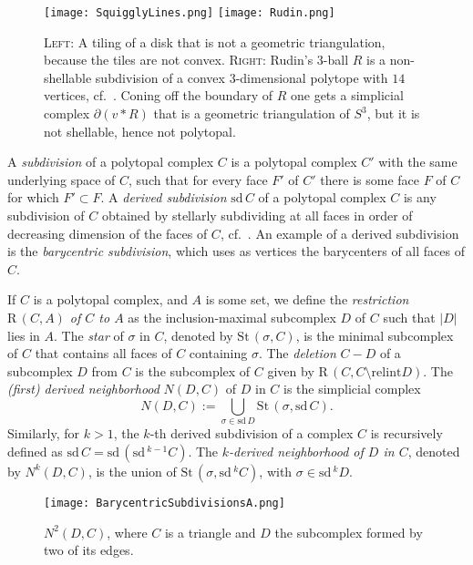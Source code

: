 \documentclass[a4paper,11pt]{article}
\theoremstyle{plain}
\theoremstyle{definition}
\newcommand{\rint}{\mathrm{relint}}
\newcommand{\RS}{\mathrm{R}\,}
\newcommand{\St}{\mathrm{St}\, }
\newcommand{\sd}{\mathrm{sd}\, }
\begin{document}
\begin{figure}[htb]
	\centering
  \texttt{[image: SquigglyLines.png]}
  \hskip10mm
    \texttt{[image: Rudin.png]}
 	\caption{\footnotesize \textsc{Left:} A tiling of a disk that is not a geometric triangulation, because the tiles are not convex. \textsc{Right:} Rudin's $3$-ball $R$ is a non-shellable subdivision of a convex $3$-dimensional polytope with $14$ vertices, cf.~\cite{Wotzlaw}. Coning off the boundary of $R$ one gets a simplicial complex $\partial (v \ast R)$ that is a geometric triangulation of $S^3$, but it is not shellable, hence not polytopal.}
	\label{fig:NonGeo}
\end{figure}


A \emph{subdivision} of a polytopal complex $C$ is a polytopal complex $C'$ with the same underlying space of $C$, such that for every face $F'$ of $C'$ there is some face $F$ of $C$ for which $F' \subset F$. A \emph{derived subdivision} $\sd  C$ of a polytopal complex $C$ is any subdivision of $C$ obtained by stellarly subdividing at all faces in order of decreasing dimension of the faces of $C$, cf.\ \cite{Hudson}.  An example of a derived subdivision is the \emph{barycentric subdivision}, which uses as vertices the barycenters of all faces of $C$.
 
If $C$ is a polytopal complex, and $A$ is some set, we define the \emph{restriction $\RS(C,A)$ of $C$ to $A$} as the inclusion-maximal subcomplex $D$ of $C$ such that $|D|$ lies in $A$. The \emph{star} of $\sigma$ in $C$, denoted by $\St(\sigma, C)$, is the minimal subcomplex of $C$ that contains all faces of $C$ containing $\sigma$. The \emph{deletion} $C-D$ of a subcomplex $D$ from $C$ is the subcomplex of $C$ given by $\RS(C,  C{\setminus} \rint{D})$. The \emph{(first) derived neighborhood} $N(D,C)$ of $D$ in $C$ is the simplicial complex
\[N(D,C):=\bigcup_{\sigma\in \sd D} \St(\sigma,\sd C). \] 
Similarly, for $k > 1$,  the $k$-th derived subdivision of a complex $C$ is recursively defined as $\sd C = \sd (\sd^{k-1} C)$. The \emph{$k$-derived neighborhood of $D$ in $C$}, denoted by $N^k(D,C)$, is the union of $\St(\sigma, \sd^k C)$, with $\sigma \in \sd^k D$.

\begin{figure}[hbtp] 	\centering
\texttt{[image: BarycentricSubdivisionsA.png]} 
\caption{\footnotesize $N^2(D,C)$, where $C$ is a triangle and $D$ the subcomplex formed by two of its edges.}
\end{figure}
\end{document}
